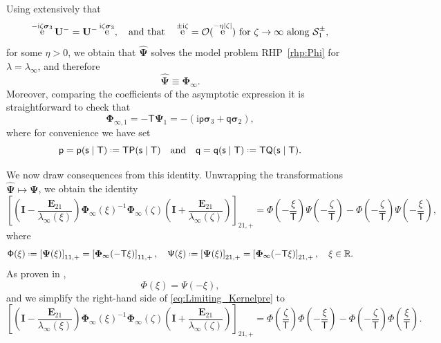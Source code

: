 \documentclass[reqno,a4paper,11pt]{amsart}
\DeclareMathOperator{\ee}{\rm e}
\newcommand{\R}{\mathbb{R}}
\newcommand{\Boh}{\mathcal{O}}
\newcommand{\ii}{\mathrm{i}}
\newcommand*{\deff}{\mathrel{\vcenter{\baselineskip0.5ex \lineskiplimit0pt
                     \hbox{\scriptsize.}\hbox{\scriptsize.}}}%
                     =}
\renewcommand{\bm}{\mathbf}
\newcommand{\mcal}{\mathcal}
\newcommand{\msf}{\mathsf}
\newcommand{\wh}{\widehat}
\renewcommand{\sp}{\boldsymbol \sigma}
\newcommand{\sad}{\msf s}
\theoremstyle{definition}
\theoremstyle{remark}
\numberwithin{equation}{section}
\begin{document}
Using extensively that
%
$$
\ee^{-\ii \zeta \sp_3}\bm U^-=\bm U^- \ee^{\ii \zeta\sp_3},\quad \text{and that}\quad \ee^{\pm \ii\zeta}=\Boh(\ee^{-\eta|\zeta|}) \text{ for } \zeta\to \infty \text{ along }\mcal S^\pm_1,
$$
%
for some $\eta>0$, we obtain that $\wh{\bm \Psi}$ solves the model problem RHP~\ref{rhp:Phi} for $\lambda=\lambda_\infty$, and therefore
%
\[
\wh{\bm \Psi}\equiv \bm \Phi_\infty.
\]
Moreover, comparing the coefficients of the asymptotic expression it is straightforward to check that
\begin{equation}\label{eq:Phi1_decomposition}
    \bm \Phi_{\infty,1} = - \msf T \bm \Psi_1 = - \left(\ii \msf p \sp_3 + \msf q \sp_2 \right),
\end{equation}
%
where for convenience we have set
%
\begin{equation}\label{eq:msfqpmsfPQ}
\msf p=\msf p(\sad\mid \msf T)\deff \msf T\msf P(\sad\mid \msf T)\quad \text{and}\quad \msf q=\msf q(\sad\mid \msf T)\deff \msf T\msf Q(\sad\mid \msf T).
\end{equation}


We now draw consequences from this identity. Unwrapping the transformations $\wh{\bm \Psi}\mapsto \bm\Psi$, we obtain the identity
%
\begin{equation}\label{eq:Limiting_Kernelpre}
\left[
\left(\bm I-\frac{\bm E_{21}}{\lambda_\infty(\xi)}\right)\bm\Phi_\infty(\xi)^{-1}\bm\Phi_\infty(\zeta)\left(\bm I+\frac{\bm E_{21}}{\lambda_\infty(\zeta)}\right)
\right]_{21,+}=
    \msf \Phi\left(-\frac{\xi}{\msf T}\right)\msf \Psi\left(-\frac{\zeta}{\msf T}\right)-\msf \Phi\left(-\frac{\zeta}{\msf T}\right)\msf \Psi\left(-\frac{\xi}{\msf T}\right),
\end{equation}
%
where
%
\begin{equation}\label{eq:PhiscalarPhimatrix}
\msf \Phi(\xi)\deff \left[\bm\Psi(\xi)\right]_{11,+}=\left[\bm \Phi_{\infty}(-\msf T\xi)\right]_{11,+},\quad
%
\msf \Psi(\xi)\deff \left[\bm\Psi(\xi)\right]_{21,+}
    =\left[\bm \Phi_{\infty}(-\msf T\xi)\right]_{21,+},\quad \xi\in \R.
\end{equation}
%
As proven in \cite[Corollary~5.2 and Proposition~5.3]{ClaeysTarricone24},
%
$$
\msf \Phi(\xi)=\msf \Psi(-\xi),
$$
%
and we simplify the right-hand side of \eqref{eq:Limiting_Kernelpre} to
%
\begin{equation}\label{eq:Limiting_Kernel}
\left[
    \left(\bm I-\frac{\bm E_{21}}{\lambda_\infty(\xi)}\right)\bm\Phi_\infty(\xi)^{-1}\bm\Phi_\infty(\zeta)\left(\bm I+\frac{\bm E_{21}}{\lambda_\infty(\zeta)}\right)\right]_{21,+}
        = \msf \Phi\left(\frac{\zeta}{\msf T}\right)\msf \Phi\left(-\frac{\xi}{\msf T}\right)-\msf \Phi\left(-\frac{\zeta}{\msf T}\right)\msf \Phi\left(\frac{\xi}{\msf T}\right).
\end{equation}
\end{document}
